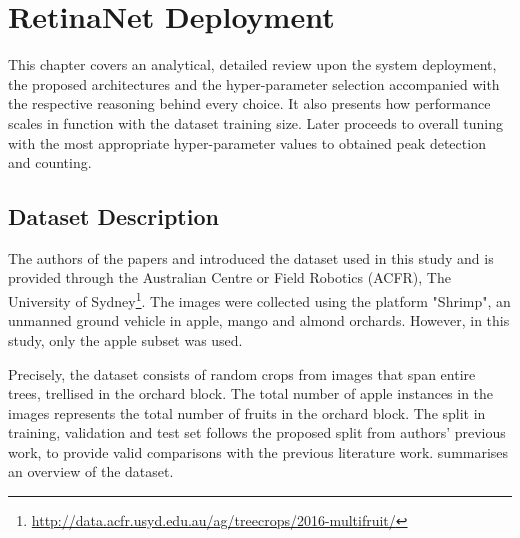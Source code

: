 \chapter{RetinaNet Deployment} \label{Chapter:Experiment}
This chapter covers an analytical, detailed review upon the system deployment, the proposed architectures and the hyper-parameter selection accompanied with the respective reasoning behind every choice. It also presents how performance scales in function with the dataset training size. Later proceeds to overall tuning with the most appropriate hyper-parameter values to obtained peak detection and counting.

\section{Dataset Description}
The authors of the papers \cite{bargoti2017image} and \cite{bargoti2017deep} introduced the dataset used in this study and is provided through the Australian Centre or Field Robotics (ACFR), The University of Sydney\footnote{\url{http://data.acfr.usyd.edu.au/ag/treecrops/2016-multifruit/}}. The images were collected using the platform "Shrimp", an unmanned ground vehicle in apple, mango and almond orchards. However, in this study, only the apple subset was used.

Precisely, the dataset consists of random crops from images that span entire trees, trellised in the orchard block. The total number of apple instances in the images represents the total number of fruits in the orchard block. The split in training, validation and test set follows the proposed split from authors' previous work, to provide valid comparisons with the previous literature work.  summarises an overview of the dataset.

\begin{table}[!htb]
  \centering
  \caption{ACFR dataset description}
  \label{tab1}
\end{table}

